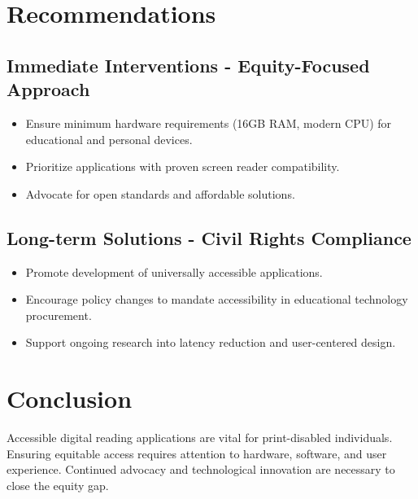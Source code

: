 \section{Recommendations}
\subsection{Immediate Interventions - Equity-Focused Approach}
\begin{itemize}
	\item Ensure minimum hardware requirements (16GB RAM, modern CPU) for educational and personal devices.
	\item Prioritize applications with proven screen reader compatibility.
	\item Advocate for open standards and affordable solutions.
\end{itemize}

\subsection{Long-term Solutions - Civil Rights Compliance}
\begin{itemize}
	\item Promote development of universally accessible applications.
	\item Encourage policy changes to mandate accessibility in educational technology procurement.
	\item Support ongoing research into latency reduction and user-centered design.
\end{itemize}

\section{Conclusion}
Accessible digital reading applications are vital for print-disabled individuals. Ensuring equitable access requires attention to hardware, software, and user experience. Continued advocacy and technological innovation are necessary to close the equity gap.
